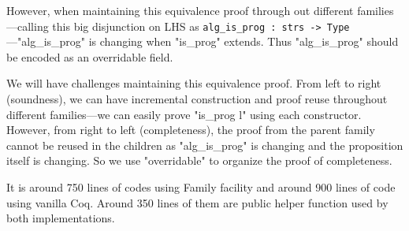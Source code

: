 However, when maintaining this equivalence proof through out different families---calling this big disjunction on LHS as \texttt{alg_is_prog : strs -> Type}---"alg_is_prog" is changing when "is_prog" extends. Thus "alg_is_prog" should be encoded as an overridable field. 

We will have challenges maintaining this equivalence proof. From left to right (soundness), we can have incremental construction and proof reuse throughout different families---we can easily prove "is_prog l" using each constructor. However, from right to left (completeness), the proof from the parent family cannot be reused in the children as "alg_is_prog" is changing and the proposition itself is changing. So we use "overridable" to organize the proof of completeness. 

It is around 750 lines of codes using Family facility and around 900 lines of code using vanilla Coq. Around 350 lines of them are public helper function used by both implementations.




